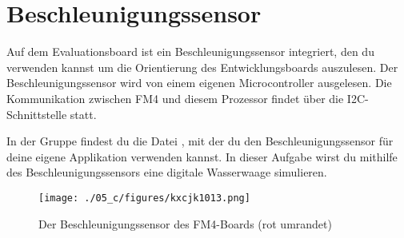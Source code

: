 \clearpage
\section{\ExercisePrefixEmbeddedC Beschleunigungssensor \optional}

\optionaltextboxC

Auf dem Evaluationsboard ist ein Beschleunigungssensor integriert, den du verwenden kannst um die Orientierung des Entwicklungsboards auszulesen.
Der Beschleunigungssensor wird von einem eigenen Microcontroller ausgelesen.
Die Kommunikation zwischen FM4 und diesem Prozessor findet über die I2C-Schnittstelle statt.

In der Gruppe  findest du die Datei , mit der du den Beschleunigungssensor für deine eigene Applikation verwenden kannst.
In dieser Aufgabe wirst du mithilfe des Beschleunigungssensors eine digitale Wasserwaage simulieren. 
%
\begin{figure}[!htb]
	\centering
	\texttt{[image: ./05\_c/figures/kxcjk1013.png]}
	\caption{Der Beschleunigungssensor des FM4-Boards (rot umrandet)}
	\label{fig:accelerometer}
\end{figure} 

